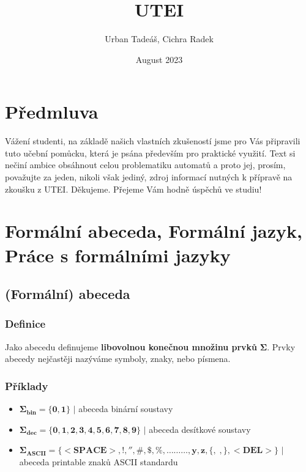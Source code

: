 \documentclass{report}
\title{UTEI}
\author{Urban Tadeáš, Cichra Radek }
\date{August 2023}
\newcommand\blankpage{%
    \null
    \thispagestyle{empty}%
    \addtocounter{page}{-1}%
    \newpage}
\begin{document}
\maketitle

\afterpage{\blankpage}

\chapter*{Předmluva}
Vážení studenti,\newline
na základě našich vlastních zkušeností jsme pro Vás připravili tuto učební pomůcku, která je psána především pro praktické využití. Text si nečiní ambice obsáhnout celou problematiku automatů a proto jej, prosím, považujte za jeden, nikoli však jediný, zdroj informací nutných k přípravě na zkoušku z UTEI.\newline 
Děkujeme.
\newline
\newline
Přejeme Vám hodně úspěchů ve studiu!
\newline


\renewcommand{\contentsname}{Obsah}
\tableofcontents


\setcounter{chapter}{1}
\chapter*{Formální abeceda, Formální jazyk, Práce s formálními jazyky}
\section{(Formální) abeceda}

\subsection*{Definice}
Jako abecedu definujeme \textbf{libovolnou konečnou množinu prvků} $\mathbf{\Sigma}$. \newline
Prvky abecedy nejčastěji nazýváme symboly, znaky, nebo písmena.
\subsection*{Příklady}
\begin{itemize}
    \item[] $\mathbf{{\Sigma}_{bin} = \{ 0,1 \}}$  $\mid$ abeceda binární soustavy
    \item[] $\mathbf{{\Sigma}_{dec} = \{ 0,1,2,3,4,5,6,7,8,9 \}}$  $\mid$ abeceda desítkové soustavy
    \item[] $\mathbf{{\Sigma}_{ASCII} = \{  <SPACE>, !, '', \#, \$, \%, … … … , y, z, \{,\;, \}, <DEL>\}}$  $\mid$ abeceda printable znaků ASCII standardu 
\end{itemize}
\end{document}
